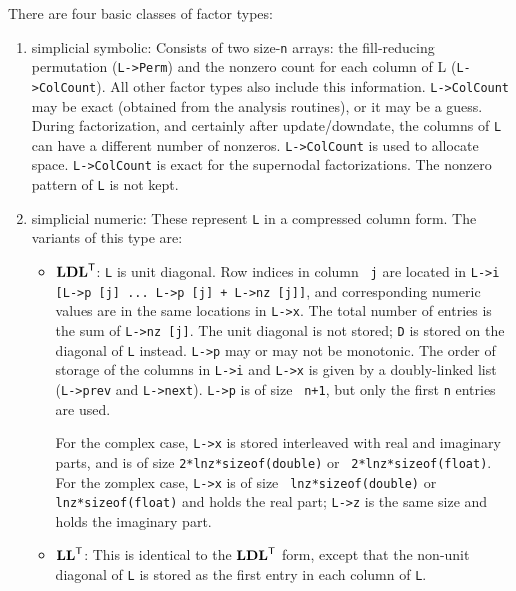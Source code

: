 \documentclass[11pt]{article}
\newcommand{\m}[1]{{\bf{#1}}}       %
\newcommand{\tr}{^{\sf T}}          %
\begin{document}
There are four basic classes of factor types:
\begin{enumerate}
\item simplicial symbolic:  Consists of two size-{\tt n} arrays: the
    fill-reducing permutation ({\tt L->Perm}) and the nonzero count for each
    column of L ({\tt L->ColCount}).  All other factor types also include this
    information.  {\tt L->ColCount} may be exact (obtained from the analysis
    routines), or it may be a guess.  During factorization, and certainly after
    update/downdate, the columns of {\tt L} can have a different number of
    nonzeros.  {\tt L->ColCount} is used to allocate space.  {\tt L->ColCount}
    is exact for the supernodal factorizations.  The nonzero pattern of {\tt L}
    is not kept.

\item simplicial numeric:  These represent {\tt L} in a compressed column form.
    The variants of this type are:

    \begin{itemize}
    \item $\m{LDL}\tr$: {\tt L} is unit diagonal.  Row indices in column {\tt
        j} are located in {\tt L->i [L->p [j] ... L->p [j] + L->nz [j]]}, and
        corresponding numeric values are in the same locations in {\tt L->x}.
        The total number of entries is the sum of {\tt L->nz [j]}.  The unit
        diagonal is not stored; {\tt D} is stored on the diagonal of {\tt L}
        instead.  {\tt L->p} may or may not be monotonic.  The order of storage
        of the columns in {\tt L->i} and {\tt L->x} is given by a doubly-linked
        list ({\tt L->prev} and {\tt L->next}).  {\tt L->p} is of size {\tt
        n+1}, but only the first {\tt n} entries are used.

        For the complex case, {\tt L->x} is stored interleaved with real and
        imaginary parts, and is of size {\tt 2*lnz*sizeof(double)} or {\tt
        2*lnz*sizeof(float)}.  For the zomplex case, {\tt L->x} is of size {\tt
        lnz*sizeof(double)} or {\tt lnz*sizeof(float)} and holds the real part;
        {\tt L->z} is the same size and holds the imaginary part.

    \item $\m{LL}\tr$:  This is identical to the $\m{LDL}\tr$ form, except that
        the non-unit diagonal of {\tt L} is stored as the first entry in each
        column of {\tt L}.

    \end{itemize}


\end{enumerate}
\end{document}
